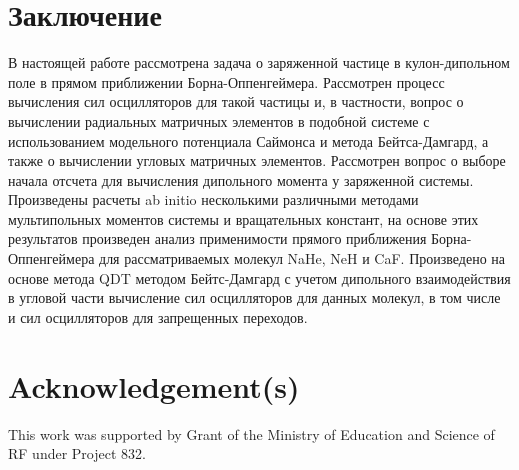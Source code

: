 \documentclass[]{interact}
\theoremstyle{plain}%
\theoremstyle{definition}
\theoremstyle{remark}
\begin{document}





\section{Заключение}
В настоящей работе рассмотрена задача о заряженной частице в кулон-дипольном поле в прямом приближении Борна-Оппенгеймера. Рассмотрен процесс вычисления сил осцилляторов для такой частицы и, в частности, вопрос о вычислении радиальных матричных элементов в подобной системе с использованием модельного потенциала Саймонса и метода Бейтса-Дамгард, а также о вычислении угловых матричных элементов. Рассмотрен вопрос о выборе начала отсчета для вычисления дипольного момента у заряженной системы.
Произведены расчеты ab initio несколькими различными методами мультипольных моментов системы и вращательных констант, на основе этих результатов произведен анализ применимости прямого приближения Борна-Оппенгеймера для рассматриваемых молекул NaHe, NeH и CaF. Произведено на основе метода QDT методом Бейтс-Дамгард с учетом дипольного взаимодействия в угловой части вычисление сил осцилляторов для данных молекул, в том числе и сил осцилляторов для запрещенных переходов.



\section*{Acknowledgement(s)}

This work was supported by Grant of the Ministry of Education and Science of RF under Project 832.
\end{document}
